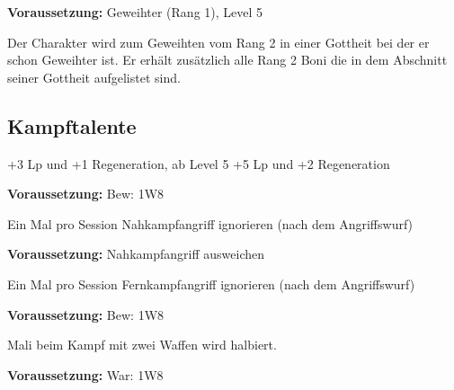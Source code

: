 \documentclass[../../Heldenanleitung2]{subfiles}
\begin{document}
\begin{multicols}{2}
\begin{tcolorbox}[title={Geweihter (Rang 2)}, colbacktitle=gray]    
	\textbf{Voraussetzung:} Geweihter (Rang 1), Level 5
	\vspace{0.2cm}	
	
   Der Charakter wird zum Geweihten vom Rang 2 in einer Gottheit bei der er schon Geweihter ist. Er erhält zusätzlich alle Rang 2 Boni die in dem Abschnitt seiner Gottheit aufgelistet sind.
\end{tcolorbox}

\end{multicols}

\subsection{Kampftalente}
\begin{multicols}{2}

\begin{tcolorbox}[title={Abhärtung},colbacktitle=red, coltitle=black]    
   +3 Lp und +1 Regeneration, ab Level 5 +5 Lp und +2 Regeneration
\end{tcolorbox}  


\begin{tcolorbox}[title={Nahkampfangriff ausweichen},colbacktitle=red, coltitle=black]
	\textbf{Voraussetzung:} Bew: 1W8
	\vspace{0.2cm}	
	
   Ein Mal pro Session Nahkampfangriff ignorieren (nach dem Angriffswurf)
\end{tcolorbox}

\begin{tcolorbox}[title={Fernkampfangriff ausweichen},colbacktitle=red, coltitle=black]    
	\textbf{Voraussetzung:} Nahkampfangriff ausweichen
	\vspace{0.2cm}	
	
   Ein Mal pro Session Fernkampfangriff ignorieren (nach dem Angriffswurf)
\end{tcolorbox}

\begin{tcolorbox}[title={Kampf mit zwei Waffen},colbacktitle=red, coltitle=black]    
	\textbf{Voraussetzung:} Bew: 1W8
	\vspace{0.2cm}
	
   Mali beim Kampf mit zwei Waffen wird halbiert.
\end{tcolorbox}

\begin{tcolorbox}[title={Kampfreflexe},colbacktitle=red, coltitle=black]    
	\textbf{Voraussetzung:} War: 1W8
	\vspace{0.2cm}
	

\end{tcolorbox}
\end{multicols}
\end{document}
